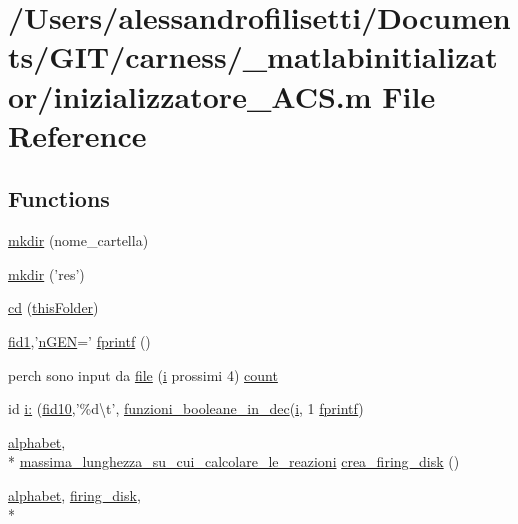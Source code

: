 \hypertarget{a00068}{\section{/\-Users/alessandrofilisetti/\-Documents/\-G\-I\-T/carness/\-\_\-matlabinitializator/inizializzatore\-\_\-\-A\-C\-S.m File Reference}
\label{a00068}
}
\subsection*{Functions}
\begin{DoxyCompactItemize}
\item 
\hyperlink{a00068_abcaf3fe79479456b56924747f1bca0d9}{mkdir} (nome\-\_\-cartella)
\item 
\hyperlink{a00068_ae58a11ed5ac7873b1039a391d5c86a05}{mkdir} ('res')
\item 
\hyperlink{a00068_a767271ad82d244871370a0f0e6a7f8a4}{cd} (\hyperlink{a00071_a2d4125646b62462ce279d82913125ccf}{this\-Folder})
\item 
\hyperlink{a00068_aff1e821fc5f97a0758f74b5cbd00cacf}{fid1},'\hyperlink{a00070_a82556659f7ba7219e55a18e9b9e63873}{n\-G\-E\-N}=' \hyperlink{a00068_aa6dc40efe43a338c9ff278260d95b4d9}{fprintf} ()
\item 
perch sono input da \hyperlink{a00068_a4e8353d6c62cf54bf4a1a8f63e56b8c3}{file} (\hyperlink{a00071_ad3efca1ea6e3333daf30719ee0501862}{i} prossimi 4) \hyperlink{a00068_aa0a4866d2600caeb20cfacee8eefc922}{count}
\item 
id \hyperlink{a00068_ab5fb59cb99841dd445fbd224275fa226}{i\-:} (\hyperlink{a00068_aadad4fd2d661ea2b9f0c3a95e3f7b4ba}{fid10},'\%d\textbackslash{}t', \hyperlink{a00071_aca80ac3e93dabd95e623a51f90fb37b6}{funzioni\-\_\-booleane\-\_\-in\-\_\-dec}(\hyperlink{a00071_ad3efca1ea6e3333daf30719ee0501862}{i}, 1 \hyperlink{a00068_aa6dc40efe43a338c9ff278260d95b4d9}{fprintf})
\item 
\hyperlink{a00071_abcbc32fc68e4323620d6171a17310212}{alphabet}, \\*
\hyperlink{a00071_a4e714d8e6551275aafab501b8c9f18ad}{massima\-\_\-lunghezza\-\_\-su\-\_\-cui\-\_\-calcolare\-\_\-le\-\_\-reazioni} \hyperlink{a00068_a9436783422a447fac5122c24d195e61d}{crea\-\_\-firing\-\_\-disk} ()
\item 
\hyperlink{a00071_abcbc32fc68e4323620d6171a17310212}{alphabet}, \hyperlink{a00061_acb72987b5000cf59c6f81c482e2ac8ac}{firing\-\_\-disk}, \\*

\end{DoxyCompactItemize}
